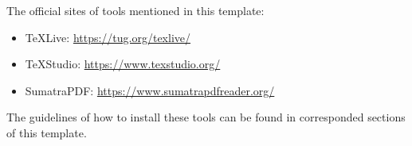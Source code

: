 \documentclass[winfonts,master,twoside,AutoFakeBold= {2}]{njuthesis}
\begin{document}
\begin{englishabstract}
	The official sites of tools mentioned in this template:
	
	\begin{itemize}
		\item TeXLive: \url{https://tug.org/texlive/}
		\item TeXStudio: \url{https://www.texstudio.org/}
		\item SumatraPDF: \url{https://www.sumatrapdfreader.org/}
	\end{itemize}

	The guidelines of how to install these tools can be found in corresponded sections of this template.
\end{englishabstract}

%
%
%
%

\tableofcontents

\listoffigures

\listoftables

\mainmatter



\end{document}
